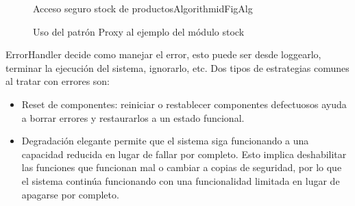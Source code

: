 \begin{figure}[h]
\caption{Uso del patrón Proxy al ejemplo del módulo stock}
\begin{center}
\end{center}

\begin{pattern}[]{Acceso seguro stock de productos}{Algorithm}{idFigAlg}
\assigns
{}

\end{pattern}

\end{figure}
ErrorHandler decide como manejar el error, esto puede ser desde loggearlo, terminar la ejecución del sistema, ignorarlo, etc. Dos tipos de estrategias comunes al tratar con errores son:
\begin{itemize}
    \item Reset de componentes: reiniciar o restablecer componentes defectuosos ayuda a borrar errores y restaurarlos a un estado funcional.
    \item Degradación elegante \cite{glass2009graceful} permite que el sistema siga funcionando a una capacidad reducida en lugar de fallar por completo. Esto implica deshabilitar las funciones que funcionan mal o cambiar a copias de seguridad, por lo que el sistema continúa funcionando con una funcionalidad limitada en lugar de apagarse por completo.
\end{itemize}


